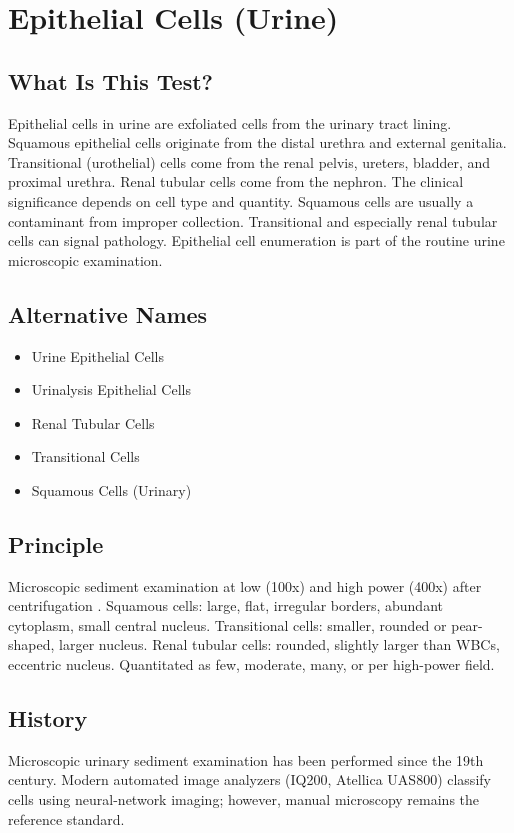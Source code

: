 \chapter{Epithelial Cells (Urine)}

\section*{What Is This Test?}
Epithelial cells in urine are exfoliated cells from the urinary tract lining. Squamous epithelial cells originate from the distal urethra and external genitalia. Transitional (urothelial) cells come from the renal pelvis, ureters, bladder, and proximal urethra. Renal tubular cells come from the nephron. The clinical significance depends on cell type and quantity. Squamous cells are usually a contaminant from improper collection. Transitional and especially renal tubular cells can signal pathology. Epithelial cell enumeration is part of the routine urine microscopic examination.

\section*{Alternative Names}
\begin{itemize}
  \item Urine Epithelial Cells
  \item Urinalysis Epithelial Cells
  \item Renal Tubular Cells
  \item Transitional Cells
  \item Squamous Cells (Urinary)
\end{itemize}
\section*{Principle}
Microscopic sediment examination at low (100x) and high power (400x) after centrifugation \cite{mcpherson2022henrys}. Squamous cells: large, flat, irregular borders, abundant cytoplasm, small central nucleus. Transitional cells: smaller, rounded or pear-shaped, larger nucleus. Renal tubular cells: rounded, slightly larger than WBCs, eccentric nucleus. Quantitated as few, moderate, many, or per high-power field.

\section*{History}
Microscopic urinary sediment examination has been performed since the 19th century. Modern automated image analyzers (IQ200, Atellica UAS800) classify cells using neural-network imaging; however, manual microscopy remains the reference standard.


